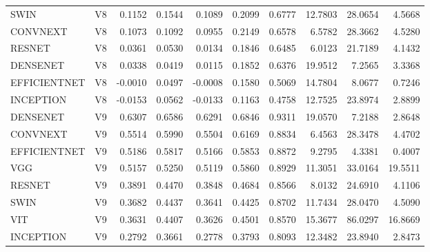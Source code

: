 \begin{table}
\begin{tabular}{llrrrrrrrr}
SWIN & V8 & 0.1152 & 0.1544 & 0.1089 & 0.2099 & 0.6777 & 12.7803 & 28.0654 & 4.5668 \\
CONVNEXT & V8 & 0.1073 & 0.1092 & 0.0955 & 0.2149 & 0.6578 & 6.5782 & 28.3662 & 4.5280 \\
RESNET & V8 & 0.0361 & 0.0530 & 0.0134 & 0.1846 & 0.6485 & 6.0123 & 21.7189 & 4.1432 \\
DENSENET & V8 & 0.0338 & 0.0419 & 0.0115 & 0.1852 & 0.6376 & 19.9512 & 7.2565 & 3.3368 \\
EFFICIENTNET & V8 & -0.0010 & 0.0497 & -0.0008 & 0.1580 & 0.5069 & 14.7804 & 8.0677 & 0.7246 \\
INCEPTION & V8 & -0.0153 & 0.0562 & -0.0133 & 0.1163 & 0.4758 & 12.7525 & 23.8974 & 2.8899 \\
DENSENET & V9 & 0.6307 & 0.6586 & 0.6291 & 0.6846 & 0.9311 & 19.0570 & 7.2188 & 2.8648 \\
CONVNEXT & V9 & 0.5514 & 0.5990 & 0.5504 & 0.6169 & 0.8834 & 6.4563 & 28.3478 & 4.4702 \\
EFFICIENTNET & V9 & 0.5186 & 0.5817 & 0.5166 & 0.5853 & 0.8872 & 9.2795 & 4.3381 & 0.4007 \\
VGG & V9 & 0.5157 & 0.5250 & 0.5119 & 0.5860 & 0.8929 & 11.3051 & 33.0164 & 19.5511 \\
RESNET & V9 & 0.3891 & 0.4470 & 0.3848 & 0.4684 & 0.8566 & 8.0132 & 24.6910 & 4.1106 \\
SWIN & V9 & 0.3682 & 0.4437 & 0.3641 & 0.4425 & 0.8702 & 11.7434 & 28.0470 & 4.5090 \\
VIT & V9 & 0.3631 & 0.4407 & 0.3626 & 0.4501 & 0.8570 & 15.3677 & 86.0297 & 16.8669 \\
INCEPTION & V9 & 0.2792 & 0.3661 & 0.2778 & 0.3793 & 0.8093 & 12.3482 & 23.8940 & 2.8473 \\
\bottomrule
\end{tabular}
\end{table}
